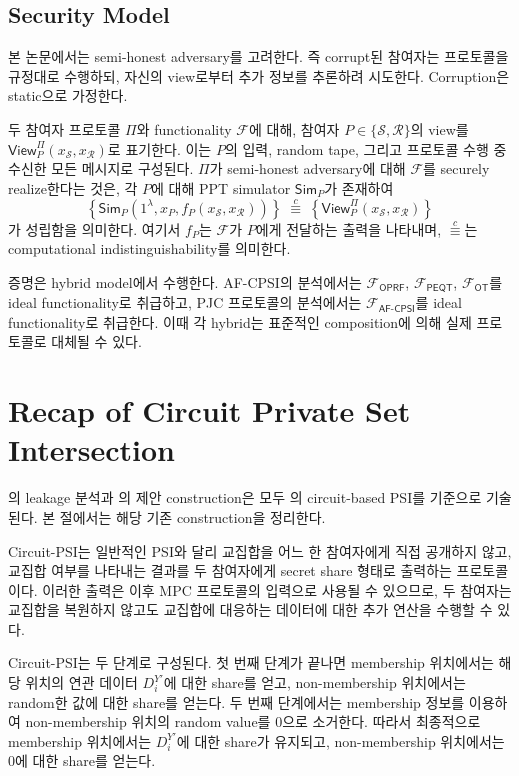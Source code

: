 \documentclass[sigconf,anonymous,review]{acmart}
\newcommand{\Snd}{\mathcal{S}}
\newcommand{\Rcv}{\mathcal{R}}
\newcommand{\func}[1]{\mathcal{F}_{\textsf{#1}}}
\begin{document}
\subsection{Security Model}\label{sec:security-model}
본 논문에서는 semi-honest adversary를 고려한다. 즉 corrupt된 참여자는
프로토콜을 규정대로 수행하되, 자신의 view로부터 추가 정보를 추론하려
시도한다. Corruption은 static으로 가정한다.

두 참여자 프로토콜 $\Pi$와 functionality $\mathcal{F}$에 대해,
참여자 $P\in\{\Snd,\Rcv\}$의 view를
$\mathsf{View}^{\Pi}_{P}(x_\Snd,x_\Rcv)$로 표기한다. 이는 $P$의 입력,
random tape, 그리고 프로토콜 수행 중 수신한 모든 메시지로 구성된다.
$\Pi$가 semi-honest adversary에 대해 $\mathcal{F}$를 securely realize한다는
것은, 각 $P$에 대해 PPT simulator $\mathsf{Sim}_P$가 존재하여
\[
\left\{
    \mathsf{Sim}_P\!\left(1^\lambda, x_P, f_P(x_\Snd,x_\Rcv)\right)
\right\}
\;\stackrel{c}{\equiv}\;
\left\{
    \mathsf{View}^{\Pi}_{P}(x_\Snd,x_\Rcv)
\right\}
\]
가 성립함을 의미한다. 여기서 $f_P$는 $\mathcal{F}$가 $P$에게 전달하는
출력을 나타내며, $\stackrel{c}{\equiv}$는 computational
indistinguishability를 의미한다.

증명은 hybrid model에서 수행한다. AF-CPSI의 분석에서는
$\func{OPRF}$, $\func{PEQT}$, $\func{OT}$를 ideal functionality로
취급하고, PJC 프로토콜의 분석에서는 $\func{AF-CPSI}$를 ideal
functionality로 취급한다. 이때 각 hybrid는 표준적인 composition에 의해
실제 프로토콜로 대체될 수 있다.

\section{Recap of Circuit Private Set Intersection}\label{sec:cpsi-recap}
의 leakage 분석과 의 제안
construction은 모두 \cite{PSTY19,RS21}의 circuit-based PSI를 기준으로
기술된다. 본 절에서는 해당 기존 construction을 정리한다.

Circuit-PSI는 일반적인 PSI와 달리 교집합을 어느 한 참여자에게
직접 공개하지 않고, 교집합 여부를 나타내는 결과를 두 참여자에게
secret share 형태로 출력하는 프로토콜이다. 이러한 출력은 이후
MPC 프로토콜의 입력으로 사용될 수 있으므로, 두 참여자는 교집합을
복원하지 않고도 교집합에 대응하는 데이터에 대한 추가 연산을
수행할 수 있다.

Circuit-PSI는 두 단계로 구성된다. 첫 번째 단계가 끝나면
membership 위치에서는 해당 위치의 연관 데이터 $D_i^{Y'}$에 대한
share를 얻고, non-membership 위치에서는 random한 값에 대한 share를
얻는다. 두 번째 단계에서는 membership 정보를 이용하여
non-membership 위치의 random value를 $0$으로 소거한다.
따라서 최종적으로 membership 위치에서는 $D_i^{Y'}$에 대한 share가
유지되고, non-membership 위치에서는 $0$에 대한 share를 얻는다.
\end{document}
